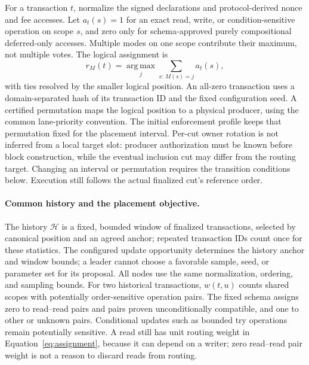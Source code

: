 For a transaction \(t\), normalize the signed declarations and protocol-derived nonce and fee accesses. Let \(a_t(s)=1\) for an exact read, write, or condition-sensitive operation on scope \(s\), and zero only for schema-approved purely compositional deferred-only accesses. Multiple modes on one scope contribute their maximum, not multiple votes. The logical assignment is
\begin{equation}
 r_M(t)=\operatorname*{arg\,max}_{j}
          \sum_{s:\,M(s)=j} a_t(s),
\label{eq:assignment}
\end{equation}
with ties resolved by the smaller logical position. An all-zero transaction uses a domain-separated hash of its transaction ID and the fixed configuration seed. A certified permutation maps the logical position to a physical producer, using the common lane-priority convention. The initial enforcement profile keeps that permutation fixed for the placement interval. Per-cut owner rotation is not inferred from a local target slot: producer authorization must be known before block construction, while the eventual inclusion cut may differ from the routing target. Changing an interval or permutation requires the transition conditions below. Execution still follows the actual finalized cut's reference order.

\paragraph{Common history and the placement objective.}
The history \(\mathcal H\) is a fixed, bounded window of finalized transactions, selected by canonical position and an agreed anchor; repeated transaction IDs count once for these statistics. The configured update opportunity determines the history anchor and window bounds; a leader cannot choose a favorable sample, seed, or parameter set for its proposal. All nodes use the same normalization, ordering, and sampling bounds. For two historical transactions, \(w(t,u)\) counts shared scopes with potentially order-sensitive operation pairs. The fixed schema assigns zero to read--read pairs and pairs proven unconditionally compatible, and one to other or unknown pairs. Conditional updates such as bounded try operations remain potentially sensitive. A read still has unit routing weight in Equation~\ref{eq:assignment}, because it can depend on a writer; zero read--read pair weight is not a reason to discard reads from routing.

